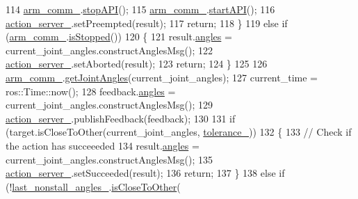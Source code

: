 \begin{DoxyCode}
114                 \hyperlink{classjaco_1_1JacoAnglesActionServer_a72ed0ccae4532199d387cc3bfe278cb0}{arm\_comm\_}.\hyperlink{classjaco_1_1JacoComm_a54862830cd6414ae3ae48e46e54bf798}{stopAPI}();
115                 \hyperlink{classjaco_1_1JacoAnglesActionServer_a72ed0ccae4532199d387cc3bfe278cb0}{arm\_comm\_}.\hyperlink{classjaco_1_1JacoComm_a6b2a1fabc4e6c30da42c9a5e26757398}{startAPI}();
116                 \hyperlink{classjaco_1_1JacoAnglesActionServer_a29d204d1bff466987e69761085a3c532}{action\_server\_}.setPreempted(result);
117                 \textcolor{keywordflow}{return};
118             \}
119             \textcolor{keywordflow}{else} \textcolor{keywordflow}{if} (\hyperlink{classjaco_1_1JacoAnglesActionServer_a72ed0ccae4532199d387cc3bfe278cb0}{arm\_comm\_}.\hyperlink{classjaco_1_1JacoComm_a872b8033cda5a9fe4ccdca2e89aa03d1}{isStopped}())
120             \{
121                 result.\hyperlink{structjaco__msgs_1_1ArmJointAnglesResult___a5b6fe64a0d822194474af38863a9f8a2}{angles} = current\_joint\_angles.constructAnglesMsg();
122                 \hyperlink{classjaco_1_1JacoAnglesActionServer_a29d204d1bff466987e69761085a3c532}{action\_server\_}.setAborted(result);
123                 \textcolor{keywordflow}{return};
124             \}
125 
126             \hyperlink{classjaco_1_1JacoAnglesActionServer_a72ed0ccae4532199d387cc3bfe278cb0}{arm\_comm\_}.\hyperlink{classjaco_1_1JacoComm_a5fcb23bf6925a82f2ab5e42460ea3834}{getJointAngles}(current\_joint\_angles);
127             current\_time = ros::Time::now();
128             feedback.\hyperlink{structjaco__msgs_1_1ArmJointAnglesFeedback___a5b3d327fd594aa0715666bf1c95359e4}{angles} = current\_joint\_angles.constructAnglesMsg();
129             \hyperlink{classjaco_1_1JacoAnglesActionServer_a29d204d1bff466987e69761085a3c532}{action\_server\_}.publishFeedback(feedback);
130 
131             \textcolor{keywordflow}{if} (target.isCloseToOther(current\_joint\_angles, \hyperlink{classjaco_1_1JacoAnglesActionServer_acc1edd1f538d1bf9c05c91c94a4abfa1}{tolerance\_}))
132             \{
133                 \textcolor{comment}{// Check if the action has succeeeded}
134                 result.\hyperlink{structjaco__msgs_1_1ArmJointAnglesResult___a5b6fe64a0d822194474af38863a9f8a2}{angles} = current\_joint\_angles.constructAnglesMsg();
135                 \hyperlink{classjaco_1_1JacoAnglesActionServer_a29d204d1bff466987e69761085a3c532}{action\_server\_}.setSucceeded(result);
136                 \textcolor{keywordflow}{return};
137             \}
138             \textcolor{keywordflow}{else} \textcolor{keywordflow}{if} (!\hyperlink{classjaco_1_1JacoAnglesActionServer_adb99422d834b8a2fa5f26ddd3ac95e52}{last\_nonstall\_angles\_}.\hyperlink{classjaco_1_1JacoAngles_aff68997afe0dac41e4c777b649c2b5d4}{isCloseToOther}(

\end{DoxyCode}
